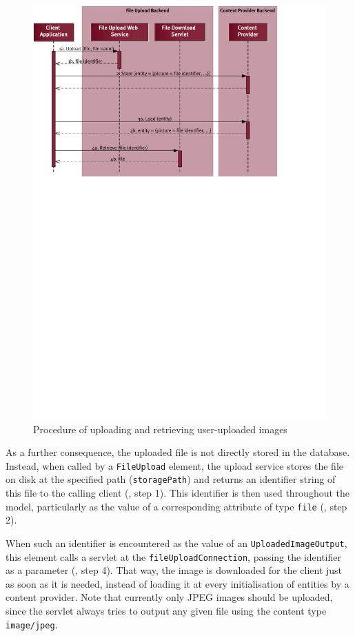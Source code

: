 \begin{figure}[b!]
\centering %
\includegraphics[clip,  trim=0 17.4cm 3.cm 0, scale=0.8]{Fig/upload-sequence.pdf}
\caption{Procedure of uploading and retrieving user-uploaded images}
\label{fig:remoteFileUpload}
\end{figure}

As a further consequence, the uploaded file is not directly stored in the database. Instead, when called by a \lstinline|FileUpload| element, the upload service stores the file on disk at the specified path (\lstinline|storagePath|) and returns an identifier string of this file to the calling client (, step 1).
This identifier is then used throughout the model, particularly as the value of a corresponding attribute of type \lstinline|file|  (, step 2).

When such an identifier is encountered as the value of an \lstinline|UploadedImageOutput|, this element calls a servlet at the \lstinline|fileUploadConnection|, passing the identifier as a parameter (, step 4). That way, the image is downloaded for the client just as soon as it is needed, instead of loading it at every initialisation of entities by a content provider. Note that currently only JPEG images should be uploaded, since the servlet always tries to output any given file using the content type \lstinline|image/jpeg|.



